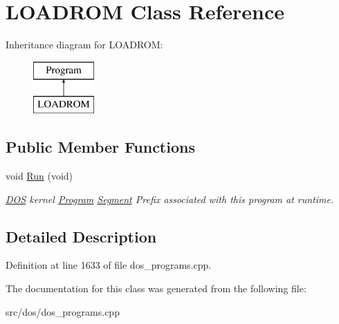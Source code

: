 \hypertarget{classLOADROM}{\section{L\-O\-A\-D\-R\-O\-M Class Reference}
\label{classLOADROM}
}
Inheritance diagram for L\-O\-A\-D\-R\-O\-M\-:\begin{figure}[H]
\begin{center}
\leavevmode
\includegraphics[height=2.000000cm]{classLOADROM}
\end{center}
\end{figure}
\subsection*{Public Member Functions}
\begin{DoxyCompactItemize}
\item 
\hypertarget{classLOADROM_a0d95e173ed8a5de685f6161ade6068f6}{void \hyperlink{classLOADROM_a0d95e173ed8a5de685f6161ade6068f6}{Run} (void)}\label{classLOADROM_a0d95e173ed8a5de685f6161ade6068f6}

\begin{DoxyCompactList}\small\item\em \hyperlink{classDOS}{D\-O\-S} kernel \hyperlink{classProgram}{Program} \hyperlink{structSegment}{Segment} Prefix associated with this program at runtime. \end{DoxyCompactList}\end{DoxyCompactItemize}


\subsection{Detailed Description}


Definition at line 1633 of file dos\-\_\-programs.\-cpp.



The documentation for this class was generated from the following file\-:\begin{DoxyCompactItemize}
\item 
src/dos/dos\-\_\-programs.\-cpp\end{DoxyCompactItemize}
